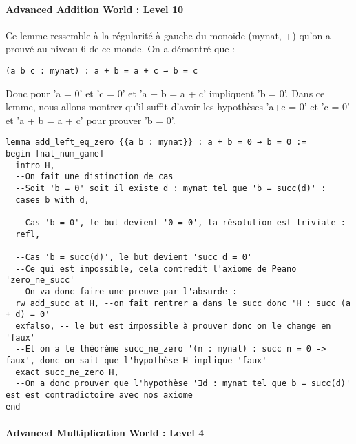 \paragraph{Advanced Addition World : Level 10}

Ce lemme ressemble à la régularité à gauche du monoïde (mynat, +) qu'on a prouvé au niveau 6 de ce monde.
On a démontré que :
\begin{verbatim}
(a b c : mynat) : a + b = a + c → b = c
\end{verbatim}
Donc pour 'a = 0' et 'c = 0' et 'a + b = a + c' impliquent 'b = 0'.
Dans ce lemme, nous allons montrer qu'il suffit d'avoir les hypothèses 'a+c = 0' et 'c = 0' et 'a + b = a + c' pour prouver 'b = 0'.

\begin{verbatim}
lemma add_left_eq_zero {{a b : mynat}} : a + b = 0 → b = 0 :=
begin [nat_num_game]
  intro H,
  --On fait une distinction de cas
  --Soit 'b = 0' soit il existe d : mynat tel que 'b = succ(d)' :
  cases b with d,

  --Cas 'b = 0', le but devient '0 = 0', la résolution est triviale :
  refl,

  --Cas 'b = succ(d)', le but devient 'succ d = 0'
  --Ce qui est impossible, cela contredit l'axiome de Peano 'zero_ne_succ'
  --On va donc faire une preuve par l'absurde :
  rw add_succ at H, --on fait rentrer a dans le succ donc 'H : succ (a + d) = 0'
  exfalso, -- le but est impossible à prouver donc on le change en 'faux'
  --Et on a le théorème succ_ne_zero '(n : mynat) : succ n = 0 -> faux', donc on sait que l'hypothèse H implique 'faux'
  exact succ_ne_zero H,
  --On a donc prouver que l'hypothèse '∃d : mynat tel que b = succ(d)' est est contradictoire avec nos axiome
end
\end{verbatim}

\paragraph{Advanced Multiplication World : Level 4}

